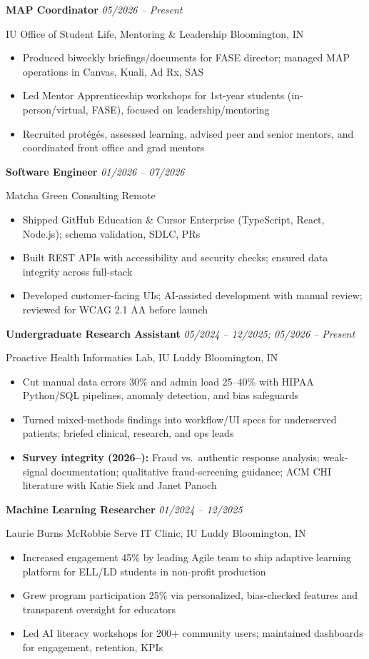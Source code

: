\documentclass[10pt]{article}
\newcommand{\exphead}[3]{%
  \noindent\textbf{#1} \hfill \textit{#3}\par
  \noindent #2\par
  \vspace{1pt}%
}
\newcommand{\expgap}{\vspace{3.5pt}}
\begin{document}
\expgap
\exphead{MAP Coordinator}{IU Office of Student Life, Mentoring \& Leadership \hfill Bloomington, IN}{05/2026 -- Present}
\begin{itemize}
  \item Produced biweekly briefings/documents for FASE director; managed MAP operations in Canvas, Kuali, Ad Rx, SAS
  \item Led Mentor Apprenticeship workshops for 1st-year students (in-person/virtual, FASE), focused on leadership/mentoring
  \item Recruited protégés, assessed learning, advised peer and senior mentors, and coordinated front office and grad mentors
\end{itemize}

\expgap
\exphead{Software Engineer}{Matcha Green Consulting \hfill Remote}{01/2026 -- 07/2026}
\begin{itemize}
  \item Shipped GitHub Education \& Cursor Enterprise (TypeScript, React, Node.js); schema validation, SDLC, PRs
  \item Built REST APIs with accessibility and security checks; ensured data integrity across full-stack
  \item Developed customer-facing UIs; AI-assisted development with manual review; reviewed for WCAG 2.1 AA before launch
\end{itemize}

\expgap
\exphead{Undergraduate Research Assistant}{Proactive Health Informatics Lab, IU Luddy \hfill Bloomington, IN}{05/2024 -- 12/2025; 05/2026 -- Present}
\begin{itemize}
  \item Cut manual data errors 30\% and admin load 25--40\% with HIPAA Python/SQL pipelines, anomaly detection, and bias safeguards
  \item Turned mixed-methods findings into workflow/UI specs for underserved patients; briefed clinical, research, and ops leads
  \item \textbf{Survey integrity (2026--):} Fraud vs.\ authentic response analysis; weak-signal documentation; qualitative fraud-screening guidance; ACM CHI literature with Katie Siek and Janet Panoch
\end{itemize}

\expgap
\exphead{Machine Learning Researcher}{Laurie Burns McRobbie Serve IT Clinic, IU Luddy \hfill Bloomington, IN}{01/2024 -- 12/2025}
\begin{itemize}
  \item Increased engagement 45\% by leading Agile team to ship adaptive learning platform for ELL/LD students in non-profit production
  \item Grew program participation 25\% via personalized, bias-checked features and transparent oversight for educators
  \item Led AI literacy workshops for 200+ community users; maintained dashboards for engagement, retention, KPIs
\end{itemize}
\end{document}
